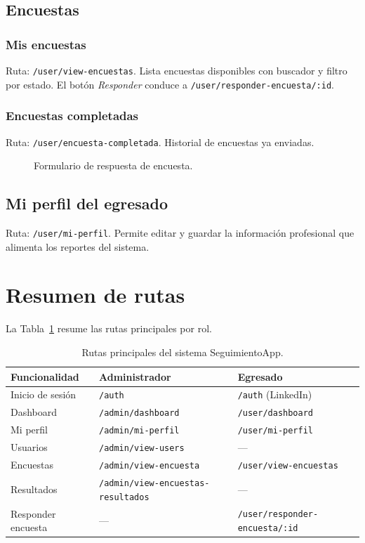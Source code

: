 \subsection{Encuestas}

\subsubsection{Mis encuestas}

Ruta: \texttt{/user/view-encuestas}. Lista encuestas disponibles con buscador y filtro por estado. El botón \emph{Responder} conduce a \texttt{/user/responder-encuesta/:id}.

\subsubsection{Encuestas completadas}

Ruta: \texttt{/user/encuesta-completada}. Historial de encuestas ya enviadas.

\begin{figure}[H]
\centering
{}
\caption{Formulario de respuesta de encuesta.}
\label{fig:responder-encuesta}
\end{figure}

\subsection{Mi perfil del egresado}

Ruta: \texttt{/user/mi-perfil}. Permite editar y guardar la información profesional que alimenta los reportes del sistema.

\section{Resumen de rutas}

La Tabla~\ref{tab:rutas-manual} resume las rutas principales por rol.

\begin{table}[H]
\centering
\caption{Rutas principales del sistema SeguimientoApp.}
\label{tab:rutas-manual}
\begin{tabular}{|l|l|l|}
\hline
\textbf{Funcionalidad} & \textbf{Administrador} & \textbf{Egresado} \\
\hline
Inicio de sesión & \texttt{/auth} & \texttt{/auth} (LinkedIn) \\
Dashboard & \texttt{/admin/dashboard} & \texttt{/user/dashboard} \\
Mi perfil & \texttt{/admin/mi-perfil} & \texttt{/user/mi-perfil} \\
Usuarios & \texttt{/admin/view-users} & --- \\
Encuestas & \texttt{/admin/view-encuesta} & \texttt{/user/view-encuestas} \\
Resultados & \texttt{/admin/view-encuestas-resultados} & --- \\
Responder encuesta & --- & \texttt{/user/responder-encuesta/:id} \\
\hline
\end{tabular}
\end{table}
